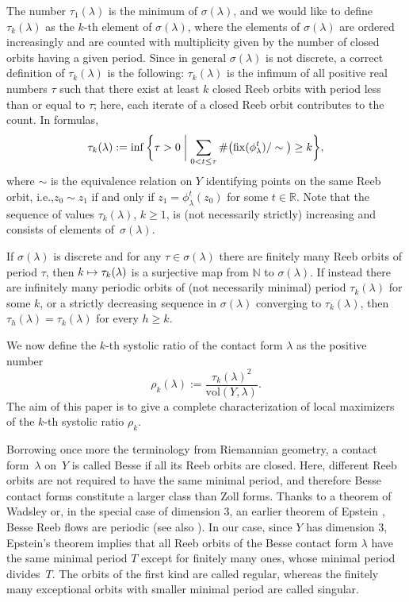 \documentclass[11pt]{article}
\newcommand{\ie}{i.e.,\xspace}
\numberwithin{equation}{section}
\let\mathds\mathbb
\newcommand\mto{\mathchoice{\longmapsto}{\mapsto}{\mapsto}{\mapsto}}
\theoremstyle{definition}
\newcommand{\vol}{\mathrm{vol}}
\newcommand{\fix}{\mathrm{fix}}
\newcommand{\N}{\mathds{N}}
\newcommand{\R}{\mathds{R}}
\begin{document}
The number $\tau_1(\lambda)$ is the minimum of $\sigma(\lambda)$, and we would like to define $\tau_k(\lambda)$ as the $k$-th element of $\sigma(\lambda)$, where the elements of $\sigma(\lambda)$ are ordered increasingly and are counted with multiplicity given by the number of closed orbits having a given period. Since in general $\sigma(\lambda)$ is not discrete, a correct definition of $\tau_k(\lambda)$ is the following: $\tau_k(\lambda)$ is the infimum of all positive real numbers $\tau$ such that there exist at least $k$ closed Reeb orbits with period less than or equal to $\tau$; here, each iterate of a closed Reeb orbit contributes to the count. In formulas,
\begin{equation}
\label{e:tau_k}
\tau_k(\lambda):=\inf\bigg\{\tau>0 \biggm| \sum_{0<t\leq\tau} \#\big(\fix(\phi_\lambda^t)/\sim\big)\geq k \bigg\},
\end{equation}
where $\sim$ is the equivalence relation on $Y$ identifying points on the same Reeb orbit, \ie $z_0\sim z_1$ if and only if $z_1=\phi_\lambda^t(z_0)$ for some $t\in\R$. Note that the sequence of values $\tau_k(\lambda)$, $k\geq1$, is (not necessarily strictly) increasing and consists of elements of~$\sigma(\lambda)$.

If $\sigma(\lambda)$ is discrete and for any $\tau \in \sigma(\lambda)$ there are finitely many Reeb orbits of period $\tau$, then $k\mto \tau_k(\lambda)$ is a surjective map from $\N$ to $\sigma(\lambda)$. If instead there are infinitely many periodic orbits of (not necessarily minimal) period $\tau_{k}(\lambda)$ for some $k$, or a strictly decreasing sequence in $\sigma(\lambda)$ converging to $\tau_{k}(\lambda)$, then $\tau_h(\lambda)=\tau_{k}(\lambda)$ for every $h\geq k$.

We now define the $k$-th systolic ratio of the contact form $\lambda$ as the positive number
\[
\rho_k(\lambda) := \frac{\tau_k(\lambda)^2}{\vol(Y,\lambda)}.
\]
The aim of this paper is to give a complete characterization of local maximizers of the $k$-th systolic ratio $\rho_k$.

Borrowing once more the terminology from Riemannian geometry, a contact form~$\lambda$ on~$Y$ is called Besse if all its Reeb orbits are closed. Here, different Reeb orbits are not required to have the same minimal period, and therefore Besse contact forms constitute a larger class than Zoll forms. Thanks to a theorem of Wadsley \cite{Wadsley:1975sp} or, in the special case of dimension $3$, an earlier theorem of Epstein \cite{Epstein:1972}, Besse Reeb flows are periodic (see also \cite{Sullivan:1978}). In our case, since $Y$ has dimension $3$, Epstein's theorem implies that all Reeb orbits of the Besse contact form $\lambda$ have the same minimal period $T$ except for finitely many ones, whose minimal period divides~$T$. The orbits of the first kind are called regular, whereas the finitely many exceptional orbits with smaller minimal period are called singular.
\end{document}
